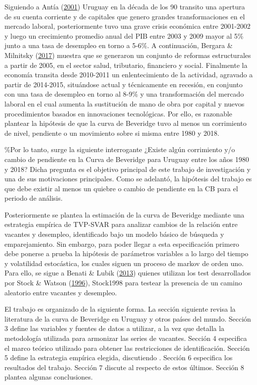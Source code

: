 \documentclass[12pt,twoside]{reedthesis}
\begin{document}
Siguiendo a Antía (\protect\hyperlink{ref-Antia2001}{2001}) Uruguay en la década de los 90 transito una apertura de su cuenta corriente y de capitales que genero grandes transformaciones en el mercado laboral, posteriormente tuvo una grave crisis económica entre 2001-2002 y luego un crecimiento promedio anual del PIB entre 2003 y 2009 mayor al 5\% junto a una tasa de desempleo en torno a 5-6\%. A continuación, Bergara \& Milnitsky (\protect\hyperlink{ref-Bergara2017}{2017}) muestra que se generaron un conjunto de reformas estructurales a partir de 2005, en el sector salud, tributario, financiero y social. Finalmente la economía transita desde 2010-2011 un enlentecimiento de la actividad, agravado a partir de 2014-2015, situándose actual y técnicamente en recesión, en conjunto con una tasa de desempleo en torno al 8-9\% y una transformación del mercado laboral en el cual aumenta la sustitución de mano de obra por capital y nuevos procedimientos basados en innovaciones tecnológicas. Por ello, es razonable plantear la hipótesis de que la curva de Beveridge tuvo al menos un corrimiento de nivel, pendiente o un movimiento sobre si misma entre 1980 y 2018.

\%Por lo tanto, surge la siguiente interrogante ¿Existe algún corrimiento y/o cambio de pendiente en la Curva de Beveridge para Uruguay entre los años 1980 y 2018? Dicha pregunta es el objetivo principal de este trabajo de investigación y una de sus motivaciones principales. Como se adelantó, la hipótesis del trabajo es que debe existir al menos un quiebre o cambio de pendiente en la CB para el periodo de análisis.

Posteriormente se plantea la estimación de la curva de Beveridge mediante una estrategia empírica de TVP-SVAR para analizar cambios de la relación entre vacantes y desempleo, identificado bajo un modelo básico de búsqueda y emparejamiento. Sin embargo, para poder llegar a esta especificación primero debe ponerse a prueba la hipótesis de parámetros variables a lo largo del tiempo y volatilidad estocástica, los cuales siguen un proceso de markov de orden uno. Para ello, se sigue a Benati \& Lubik (\protect\hyperlink{ref-Benati2013}{2013}) quienes utilizan los test desarrollados por Stock \& Watson (\protect\hyperlink{ref-Stock1996}{1996}), Stock1998 para testear la presencia de un camino aleatorio entre vacantes y desempleo.

El trabajo es organizado de la siguiente forma. La sección siguiente revisa la literatura de la curva de Beveridge en Uruguay y otros países del mundo. Sección 3 define las variables y fuentes de datos a utilizar, a la vez que detalla la metodología utilizada para armonizar las series de vacantes. Sección 4 especifica el marco teórico utilizado para obtener las restricciones de identificación. Sección 5 define la estrategia empírica elegida, discutiendo . Sección 6 especifica los resultados del trabajo. Sección 7 discute al respecto de estos últimos. Sección 8 plantea algunas conclusiones.
\end{document}
